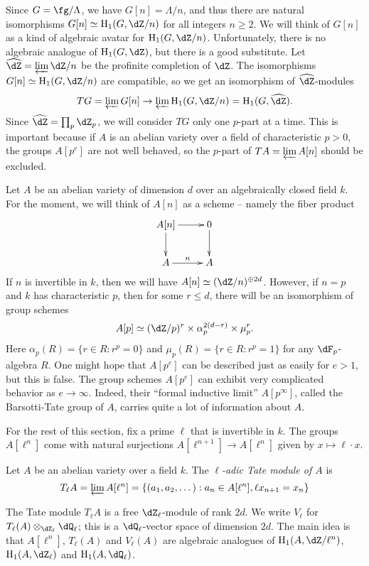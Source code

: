 Since $G=\fg/\Lambda$, we have $G[n]=\Lambda/n$, and thus there are natural 
isomorphisms $G[n]\simeq \h_1(G,\dZ/n)$ for all integers $n\geqslant 2$. 
We will think of $G[n]$ as a kind of algebraic avatar for $\h_1(G,\dZ/n)$. 
Unfortunately, there is no algebraic analogue of $\h_1(G,\dZ)$, but there is a 
good substitute. Let $\widehat\dZ=\varprojlim \dZ/n$ be the profinite 
completion of $\dZ$. The isomorphisms $G[n]\simeq \h_1(G,\dZ/n)$ are 
compatible, so we get an isomorphism of $\widehat\dZ$-modules 
\[
  T G = \varprojlim G[n] \to \varprojlim \h_1(G,\dZ/n) = \h_1(G,\widehat\dZ) \text{.}
\]
Since $\widehat\dZ=\prod_p \dZ_p$, we will consider $T G$ only one $p$-part at 
a time. This is important because if $A$ is an abelian variety over a field of 
characteristic $p>0$, the groups $A[p^e]$ are not well behaved, so the 
$p$-part of $T A=\varprojlim A[n]$ should be excluded. 

Let $A$ be an abelian variety of dimension $d$ over an algebraically closed 
field $k$. For the moment, we will think of $A[n]$ as a scheme -- namely 
the fiber product 
\[\xymatrix{
  A[n] \ar[r] \ar[d] 
    & 0 \ar[d] \\
  A \ar[r]^-n 
    & A 
}\]
If $n$ is invertible in $k$, then we will have 
$A[n]\simeq (\dZ/n)^{\oplus 2 d}$. However, if $n=p$ and $k$ has 
characteristic $p$, then for some $r\leqslant d$, 
there will be an isomorphism of group schemes 
\[
   A[p]\simeq (\dZ/p)^r\times \alpha_p^{2(d-r)}\times \mu_p^r \text{.}
\]
Here $\alpha_p(R)=\{r\in R:r^p=0\}$ and $\mu_p(R)=\{r\in R:r^p=1\}$ for any 
$\dF_p$-algebra $R$. One might hope that $A[p^e]$ can be described just as 
easily for $e>1$, but this is false. The group schemes $A[p^e]$ can exhibit 
very complicated behavior as $e\to \infty$. Indeed, their ``formal inductive 
limit'' $A[p^\infty]$, called the Barsotti-Tate group of $A$, carries quite a 
lot of information about $A$. 

For the rest of this section, fix a prime $\ell$ that is invertible in $k$. 
The groups $A[\ell^n]$ come with natural surjections 
$A[\ell^{n+1}]\to A[\ell^n]$ given by $x\mapsto \ell \cdot x$. 

\begin{definition}
Let $A$ be an abelian variety over a field $k$. The \emph{$\ell$-adic Tate 
module of $A$} is 
\[
  T_\ell A = \varprojlim A[\ell^n] = \{(a_1,a_2,\dots) : a_n\in A[\ell^n],\ell x_{n+1}=x_n\}
\]
\end{definition}

The Tate module $T_\ell A$ is a free $\dZ_\ell$-module of rank $2 d$. We write 
$V_\ell$ for $T_\ell(A)\otimes_{\dZ_\ell} \dQ_\ell$; this is a 
$\dQ_\ell$-vector space of dimension $2 d$. The main idea is that 
$A[\ell^n]$, $T_\ell(A)$ and $V_\ell(A)$ are algebraic analogues of 
$\h_1(A,\dZ/\ell^n)$, $\h_1(A,\dZ_\ell)$ and $\h_1(A,\dQ_\ell)$. 


